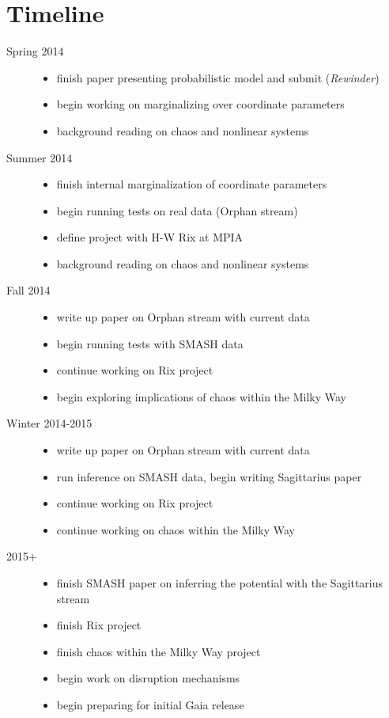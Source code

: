 \documentclass[letterpaper,12pt,preprint]{aastex}
\newcommand{\rewinder}{\emph{Rewinder}}
\begin{document}
\section{Timeline}
\noindent\begin{description}
	\item[Spring 2014] 
		\noindent\begin{itemize}
			\item finish paper presenting probabilistic model and submit (\rewinder)
			\item begin working on marginalizing over coordinate parameters
			\item background reading on chaos and nonlinear systems
		\end{itemize}
	\item[Summer 2014] 
		\noindent\begin{itemize}
			\item finish internal marginalization of coordinate parameters
			\item begin running tests on real data (Orphan stream)
			\item define project with H-W Rix at MPIA
			\item background reading on chaos and nonlinear systems
		\end{itemize}
	\item[Fall 2014] 
		\noindent\begin{itemize}
			\item write up paper on Orphan stream with current data
			\item begin running tests with SMASH data
			\item continue working on Rix project
			\item begin exploring implications of chaos within the Milky Way
		\end{itemize}
	\item[Winter 2014-2015] 
		\noindent\begin{itemize}
			\item write up paper on Orphan stream with current data
			\item run inference on SMASH data, begin writing Sagittarius paper
			\item continue working on Rix project
			\item continue working on chaos within the Milky Way
		\end{itemize}
	\item[2015+] 
		\noindent\begin{itemize}
			\item finish SMASH paper on inferring the potential with the Sagittarius stream
			\item finish Rix project
			\item finish chaos within the Milky Way project
			\item begin work on disruption mechanisms
			\item begin preparing for initial Gaia release
		\end{itemize}
\end{description}


\end{document}
